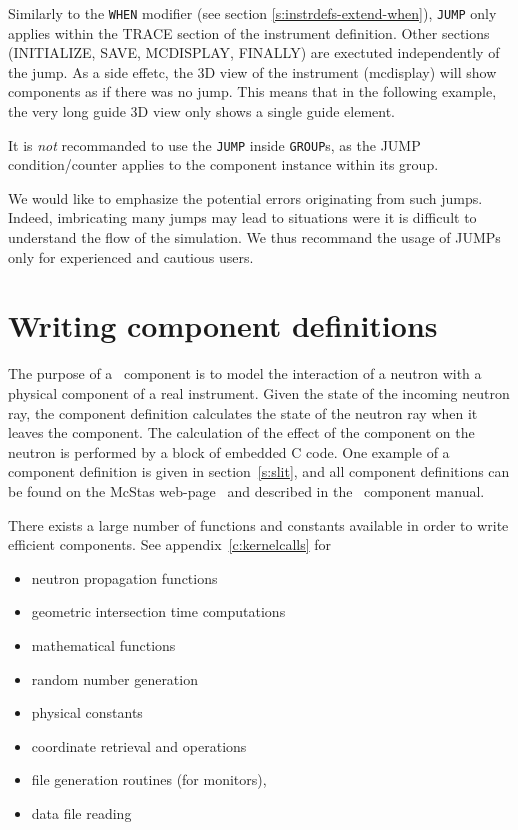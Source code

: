 Similarly to the \texttt{WHEN} modifier (see section \ref{s:instrdefs-extend-when}), \texttt{JUMP} only applies within the TRACE section of the instrument definition. Other sections (INITIALIZE, SAVE, MCDISPLAY, FINALLY) are exectuted independently of the jump. As a side effetc, the 3D view of the instrument (mcdisplay) will show components as if there was no jump. This means that in the following example, the very long guide 3D view only shows a single guide element.

It is \emph{not} recommanded to use the \verb+JUMP+ inside \verb+GROUP+s, as the JUMP condition/counter applies to the component instance within its group.

We would like to emphasize the potential errors originating from such
jumps. Indeed, imbricating many jumps may lead to situations were it
is difficult to understand the flow of the simulation. We thus recommand the usage of JUMPs only for experienced and cautious users.

\section{Writing component definitions}
\label{s:compdefs}

The purpose of a \MCS\ component is to model the interaction of a
neutron with a physical component of a real instrument. Given the
state of the incoming neutron ray, the
component definition calculates the state of the neutron ray when it leaves
the component.  The calculation of the effect of the component on the
neutron is performed by a block of embedded C code.
One example of a component definition is given in section~\ref{s:slit}, and all
component definitions can be found on the McStas
web-page~\cite{mcstas_webpage} and described in the \MCS\ component manual.

There exists a large number of functions and constants available in
order to write efficient components. See appendix~\ref{c:kernelcalls}
for
\begin{itemize}
\item neutron propagation functions
\item geometric intersection time computations
\item mathematical functions
\item random number generation
\item physical constants
\item coordinate retrieval and operations
\item file generation routines (for monitors),
\item data file reading
\end{itemize}

